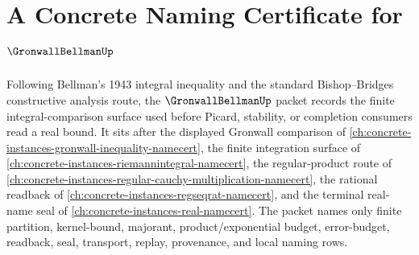 \chapter{A Concrete Naming Certificate for $\GronwallBellmanUp$}
\label{ch:concrete-instances-gronwall-bellman-namecert}

Following Bellman's 1943 integral inequality and the standard Bishop--Bridges constructive analysis route, the $\GronwallBellmanUp$ packet records the finite integral-comparison surface used before Picard, stability, or completion consumers read a real bound. It sits after the displayed Gronwall comparison of \autoref{ch:concrete-instances-gronwall-inequality-namecert}, the finite integration surface of \autoref{ch:concrete-instances-riemannintegral-namecert}, the regular-product route of \autoref{ch:concrete-instances-regular-cauchy-multiplication-namecert}, the rational readback of \autoref{ch:concrete-instances-regseqrat-namecert}, and the terminal real-name seal of \autoref{ch:concrete-instances-real-namecert}. The packet names only finite partition, kernel-bound, majorant, product/exponential budget, error-budget, readback, seal, transport, replay, provenance, and local naming rows.

